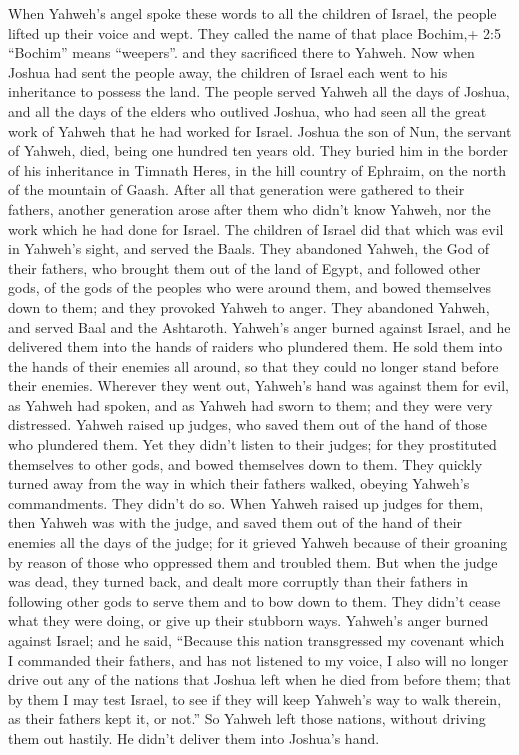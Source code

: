  When Yahweh's angel spoke these words to all the children
of Israel, the people lifted up their voice and wept.  They
called the name of that place Bochim,+ 2:5 ``Bochim'' means ``weepers''.
and they sacrificed there to Yahweh.  Now when Joshua had
sent the people away, the children of Israel each went to his
inheritance to possess the land.  The people served Yahweh
all the days of Joshua, and all the days of the elders who outlived
Joshua, who had seen all the great work of Yahweh that he had worked for
Israel.  Joshua the son of Nun, the servant of Yahweh, died,
being one hundred ten years old.  They buried him in the
border of his inheritance in Timnath Heres, in the hill country of
Ephraim, on the north of the mountain of Gaash.  After all
that generation were gathered to their fathers, another generation arose
after them who didn't know Yahweh, nor the work which he had done for
Israel.  The children of Israel did that which was evil in
Yahweh's sight, and served the Baals.  They abandoned
Yahweh, the God of their fathers, who brought them out of the land of
Egypt, and followed other gods, of the gods of the peoples who were
around them, and bowed themselves down to them; and they provoked Yahweh
to anger.  They abandoned Yahweh, and served Baal and the
Ashtaroth.  Yahweh's anger burned against Israel, and he
delivered them into the hands of raiders who plundered them. He sold
them into the hands of their enemies all around, so that they could no
longer stand before their enemies.  Wherever they went out,
Yahweh's hand was against them for evil, as Yahweh had spoken, and as
Yahweh had sworn to them; and they were very distressed. 
Yahweh raised up judges, who saved them out of the hand of those who
plundered them.  Yet they didn't listen to their judges;
for they prostituted themselves to other gods, and bowed themselves down
to them. They quickly turned away from the way in which their fathers
walked, obeying Yahweh's commandments. They didn't do so. 
When Yahweh raised up judges for them, then Yahweh was with the judge,
and saved them out of the hand of their enemies all the days of the
judge; for it grieved Yahweh because of their groaning by reason of
those who oppressed them and troubled them.  But when the
judge was dead, they turned back, and dealt more corruptly than their
fathers in following other gods to serve them and to bow down to them.
They didn't cease what they were doing, or give up their stubborn ways.
 Yahweh's anger burned against Israel; and he said,
``Because this nation transgressed my covenant which I commanded their
fathers, and has not listened to my voice,  I also will no
longer drive out any of the nations that Joshua left when he died from
before them;  that by them I may test Israel, to see if
they will keep Yahweh's way to walk therein, as their fathers kept it,
or not.''  So Yahweh left those nations, without driving
them out hastily. He didn't deliver them into Joshua's hand.

